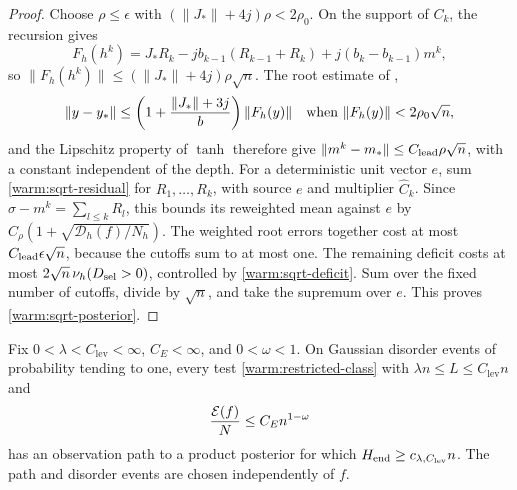\begin{proof}
Choose \(\rho\le\epsilon\) with
\((\|J_*\|+4j)\rho<2\rho_0\).
On the support of \(C_k\), the recursion gives
\[
 F_h(h^k)=J_*R_k-jb_{k-1}(R_{k-1}+R_k)
                  +j(b_k-b_{k-1})m^k,
\]
so \(\|F_h(h^k)\|\le(\|J_*\|+4j)\rho\sqrt n\).
The root estimate of \cite[Lemma~5.7]{SG},
\[
 \|y-y_*\|\le
 \left(1+\frac{\|J_*\|+3j}{b}\right)\|F_h(y)\|
 \quad\hbox{when }\|F_h(y)\|<2\rho_0\sqrt n,
\]
and the Lipschitz property of \(\tanh\) therefore give
\(\|m^k-m_*\|\le C_{\rm lead}\rho\sqrt n\), with a constant
independent of the depth.  For a deterministic unit vector \(e\),
sum \eqref{warm:sqrt-residual} for \(R_1,\ldots,R_k\), with source
\(e\) and multiplier \(\widehat C_k\).  Since
\(\sigma-m^k=\sum_{l\le k}R_l\), this bounds its reweighted mean
against \(e\) by \(C_\rho(1+\sqrt{\mathcal D_h(f)/N_h})\).
The weighted root errors together cost at most
\(C_{\rm lead}\epsilon\sqrt n\), because the cutoffs sum to at most
one.  The remaining deficit costs at most
\(2\sqrt n\,\nu_h(D_{\rm sel}>0)\), controlled by
\eqref{warm:sqrt-deficit}.  Sum over the fixed number of cutoffs,
divide by \(\sqrt n\), and take the supremum over \(e\).
This proves \eqref{warm:sqrt-posterior}.
\end{proof}

\begin{lemma}\label{warm:large-retention}
Fix \(0<\lambda<C_{\mathrm{lev}}<\infty\), \(C_E<\infty\), and \(0<\omega<1\).
On Gaussian disorder events of probability tending to one, every
test \eqref{warm:restricted-class} with \(\lambda n\le L\le C_{\mathrm{lev}}n\)
and
\begin{equation}
 \frac{\mathcal E(f)}N\le C_E n^{1-\omega}                       \label{warm:large-energy-assumption}
\end{equation}
has an observation path to a product posterior for which
\(H_{\rm end}\ge c_{\lambda,C_{\mathrm{lev}}}n\).  The path and disorder events
are chosen independently of \(f\).
\end{lemma}

